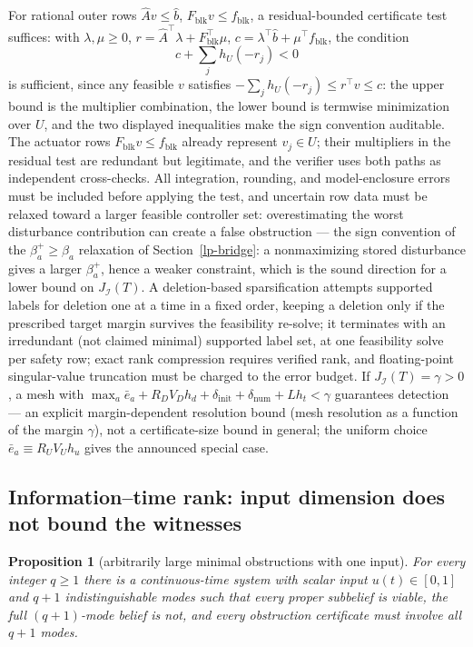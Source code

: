 \documentclass[10pt,twocolumn]{article}
\theoremstyle{plain}
\newtheorem{proposition}[theorem]{Proposition}
\theoremstyle{definition}
\theoremstyle{remark}
\begin{document}
For rational outer rows \(\widehat A v \le \widehat b\),
\(F_{\mathrm{blk}} v \le f_{\mathrm{blk}}\), a residual-bounded certificate
test suffices: with \(\lambda, \mu \ge 0\),
\(r = \widehat A^\top \lambda + F_{\mathrm{blk}}^\top \mu\),
\(c = \lambda^\top \widehat b + \mu^\top f_{\mathrm{blk}}\), the condition
\[
c + \sum_j h_U(-r_j) < 0
\tag{11}
\]
is sufficient, since any feasible \(v\) satisfies
\(-\sum_j h_U(-r_j) \le r^\top v \le c\): the upper bound is the
multiplier combination, the lower bound is termwise minimization over
\(U\), and the two displayed inequalities make the sign convention
auditable. The actuator rows \(F_{\mathrm{blk}} v \le f_{\mathrm{blk}}\)
already represent \(v_j \in U\); their multipliers in the residual test
are redundant but legitimate, and the verifier uses both paths as
independent cross-checks. All integration, rounding, and
model-enclosure errors must be included before applying the test, and
uncertain row data must be relaxed toward a larger feasible controller set:
overestimating the worst disturbance contribution can create a false
obstruction --- the sign convention of the \(\beta_a^{+} \ge \beta_a\)
relaxation of Section~\ref{lp-bridge}: a nonmaximizing stored disturbance
gives a larger \(\beta_a^{+}\), hence a weaker constraint, which is the
sound direction for a lower bound on \(J_{\mathcal{I}}(T)\). A deletion-based sparsification attempts supported labels for deletion
one at a time in a fixed order, keeping a deletion only if the prescribed
target margin survives the feasibility re-solve; it terminates with an
irredundant (not claimed minimal) supported label set, at one feasibility
solve per safety row; exact rank compression requires verified rank, and
floating-point singular-value truncation must be charged to the error budget.
If \(J_{\mathcal{I}}(T) = \gamma > 0\), a mesh with
\(\max_a \bar{e}_a + R_D V_D h_d + \delta_{\mathrm{init}} +
\delta_{\mathrm{num}} + L h_t < \gamma\) guarantees detection --- an explicit margin-dependent resolution bound
(mesh resolution as a function of the margin \(\gamma\)), not a
certificate-size bound in general; the uniform choice \(\bar{e}_a
\equiv R_U V_U h_u\) gives the announced special case.

\subsection{Information--time rank: input dimension does not bound the witnesses}\label{lp-rank}

\begin{proposition}[arbitrarily large minimal obstructions with one input]\label{lp-prop:rank}
For every integer \(q \ge 1\) there is a continuous-time system with scalar
input \(u(t) \in [0,1]\) and \(q+1\) indistinguishable modes such that every
proper subbelief is viable, the full \((q{+}1)\)-mode belief is not, and
every obstruction certificate must involve all \(q+1\) modes.
\end{proposition}
\end{document}
